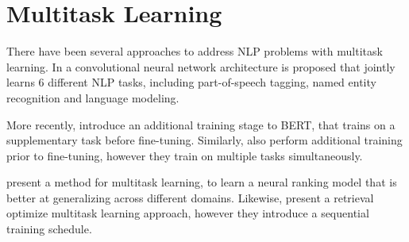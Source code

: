 \section{Multitask Learning}
There have been several approaches to address NLP problems with multitask learning. In \cite{10.1145/1390156.1390177} a convolutional neural network architecture is proposed that jointly learns 6 different NLP tasks, including part-of-speech tagging, named entity recognition and language modeling.

More recently, \cite{DBLP:journals/corr/abs-1811-01088} introduce an additional training stage to BERT, that trains on a supplementary task before fine-tuning. Similarly, \cite{DBLP:journals/corr/abs-1901-11504} also perform additional training prior to fine-tuning, however they train on multiple tasks simultaneously.

\cite{maillard-etal-2021-multi} present a method for multitask learning, to learn a neural ranking model that is better at generalizing across different domains. Likewise, \cite{Fun2021EfficientRO} present a retrieval optimize multitask learning approach, however they introduce a sequential training schedule.